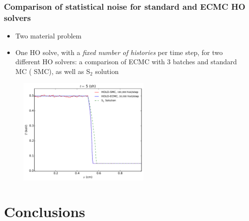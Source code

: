 \documentclass[xcolor=dvipsnames,hyperref={pdfpagelabels=false},handout,unknownkeysallowed]{beamer}
\newcommand{\colb}[1]{{\color{blue} #1}}
\newcommand{\colr}[1]{{\color{red} #1}}
\newlength{\wideitemsep}
\let\olditem\item
\renewcommand{\item}{\setlength{\itemsep}{\wideitemsep}\olditem}
\begin{document}
\begin{frame}
    \frametitle{Comparison of statistical noise for standard and ECMC HO solvers}
    \begin{block}{}
    \begin{itemize}
        \item Two material problem
        \item One HO solve, with a \emph{fixed number of histories} per time step,
            for two different HO solvers: a
            comparison of
            \colr{ECMC} with 3 batches and standard MC (\colb{SMC}), as well as S$_2$
            solution
    \end{itemize}
    \end{block}
    \centering
    \begin{figure}
    \includegraphics[width=0.5799\textwidth]{two_mat_ho_compare.pdf}
    \centering
    \end{figure}
\end{frame}

\section{Conclusions}
\subsection{}
\end{document}
